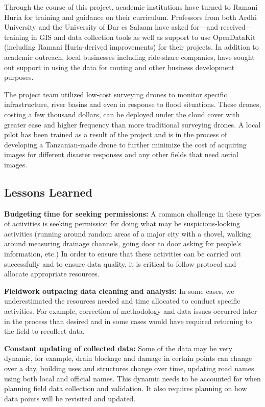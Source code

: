 \documentclass[a4paper,12pt,twoside]{article}
\begin{document}
Through the course of this project, academic institutions have turned to Ramani Huria for training and guidance on their curriculum. Professors from both Ardhi University and the University of Dar es Salaam have asked for—and received—training in GIS and data collection tools as well as support to use OpenDataKit (including Ramani Huria-derived improvements) for their projects. In addition to academic outreach, local businesses including ride-share companies, have sought out support in using the data for routing and other business development purposes. 

The project team utilized low-cost surveying drones to monitor specific infrastructure, river basins and even in response to flood situations. These drones, costing a few thousand dollars, can be deployed under the cloud cover with greater ease and higher frequency than more traditional surveying drones.   A local pilot has been trained as a result of the project and is in the process of developing a Tanzanian-made drone to further minimize the cost of acquiring images for different disaster responses and any other fields that need aerial images.

\subsection{Lessons Learned}

\textbf{Budgeting time for seeking permissions:} A common challenge in these types of activities is seeking permission for doing what may be suspicious-looking activities (running around random areas of a major city with a shovel, walking around measuring drainage channels, going door to door asking for people’s information, etc.) In order to ensure that these activities can be carried out successfully and to ensure data quality, it is critical to follow protocol and allocate appropriate resources.


\textbf{Fieldwork outpacing data cleaning and analysis:} In some cases, we underestimated the resources needed and time allocated to conduct specific activities. For example, correction of methodology and data issues occurred later in the process than desired and in some cases would have required returning to the field to recollect data.   

\textbf{Constant updating of collected data:} Some of the data may be very dynamic, for example, drain blockage and damage in certain points can change over a day, building uses and structures change over time, updating road names using both local and official names. This dynamic needs to be accounted for when planning field data collection and validation. It also requires planning on how data points will be revisited and updated. 
\end{document}
